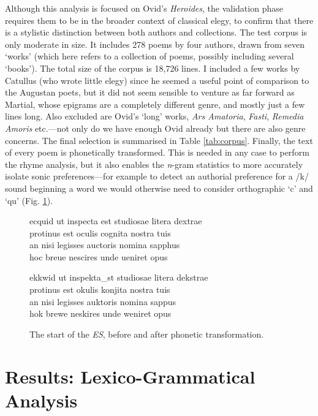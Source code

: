 \documentclass[twocolumn, switch, a4paper]{article} %
\begin{document}
Although this analysis is focused on Ovid's \emph{Heroides}, the validation
phase requires them to be in the broader context of classical elegy, to
confirm that there is a stylistic distinction between both authors and
collections. The test corpus is only moderate in size. It includes 278 poems
by four authors, drawn from seven `works' (which here refers to a collection of
poems, possibly including several `books'). The total size of the corpus is
18,726 lines. I included a few works by Catullus (who wrote little elegy)
since he seemed a useful point of comparison to the Augustan poets, but it did
not seem sensible to venture as far forward as Martial, whose epigrams are a
completely different genre, and mostly just a few lines long. Also excluded
are Ovid's `long' works, \emph{Ars Amatoria}, \emph{Fasti}, \emph{Remedia
Amoris} etc.---not only do we have enough Ovid already but there are also
genre concerns. The final selection is summarised in Table \ref{tab:corpus}.
Finally, the text of every poem is phonetically transformed. This is needed in
any case to perform the rhyme analysis, but it also enables the \emph{n}-gram
statistics to more accurately isolate sonic preferences---for example to
detect an authorial preference for a /k/ sound beginning a word we would
otherwise need to consider orthographic `c' and `qu' (Fig.
\ref{fig:phon_trans}).

\begin{figure}
\caption{The start of the \emph{ES}, before and after phonetic transformation.}
\label{fig:phon_trans}
\begin{adjustwidth}{0.07\linewidth}{0.07\linewidth}
ecquid ut inspecta est studiosae litera dextrae\\
\phantom{xx}protinus est oculis cognita nostra tuis\\
an nisi legisses auctoris nomina sapphus\\
\phantom{xx}hoc breue nescires unde ueniret opus\\
\smallskip

ekkwid ut inspekta\_st studiosae litera dekstrae\\
\phantom{xx}protinus est okulis konjita nostra tuis\\
an nisi legisses auktoris nomina sappus\\
\phantom{xx}hok brewe neskires unde weniret opus\\
\end{adjustwidth}
\end{figure}

\section{Results: Lexico-Grammatical Analysis}
\label{sec: lsa}
\end{document}
